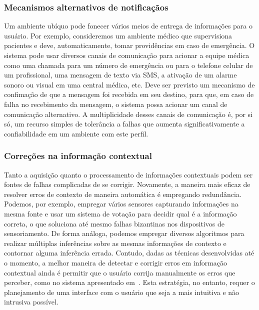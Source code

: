
\subsubsection*{Mecanismos alternativos de notificaçãos} %

Um ambiente ubíquo pode fonecer vários meios de entrega de informações para o usuário. Por exemplo, consideremos um ambiente médico que supervisiona pacientes e deve, automaticamente, tomar providências em caso de emergência. O sistema pode usar diversos canais de comunicação para acionar a equipe médica como uma chamada para um número de emergência ou para o telefone celular de um profissional, uma mensagem de texto via SMS, a ativação de um alarme sonoro ou visual em uma central médica, etc. Deve ser previsto um mecanismo de confimação de que a mensagem foi recebida em seu destino, para que, em caso de falha no recebimento da mensagem, o sistema possa acionar um canal de comunicação alternativo. A multiplicidade desses canais de comunicação é, por si só, um recurso simples de tolerância a falhas que aumenta significativamente a confiabilidade em um ambiente com este perfil.


\subsubsection*{Correções na informação contextual} %

Tanto a aquisição quanto o processamento de informações contextuais podem ser fontes de falhas complicadas de se corrigir. Novamente, a maneira mais eficaz de resolver erros de contexto de maneira automática é empregando redundância. Podemos, por exemplo, empregar vários sensores capturando informações na mesma fonte e usar um sistema de votação para decidir qual é a informação correta, o que soluciona até mesmo falhas bizantinas nos dispositivos de sensoriamento. De forma análoga, podemos empregar diversos algoritmos para realizar múltiplas inferências sobre as mesmas informações de contexto e contornar alguma inferência errada. Contudo, dadas as técnicas desenvolvidas até o momento, a melhor maneira de detectar e corrigir erros em informação contextual ainda é permitir que o usuário corrija manualmente os erros que perceber, como no sistema apresentado em~\cite{dey2002distributed}. Esta estratégia, no entanto, requer o planejamento de uma interface com o usuário que seja a mais intuitiva e não intrusiva possível.

